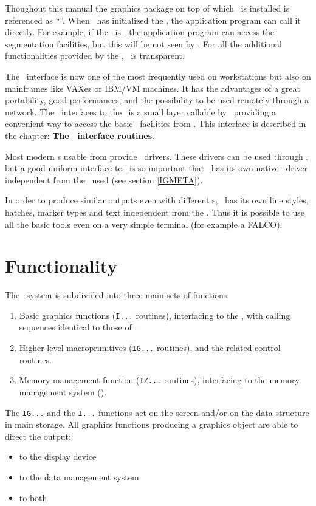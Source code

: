 Thoughout this manual the graphics package on top of which \HIGZ~is installed is
referenced as ``\UGP''. When \HIGZ~has initialized the \UGP, the application 
program can call it directly. For example, if the \UGP~is \GKS, the application
program can access the segmentation facilities, but this will be not seen by 
\HIGZ. For all the additional functionalities provided by the \UGP, \HIGZ~is
transparent.
 
The \XW~interface is now one of the most frequently used on workstations
but also on mainframes like VAXes or IBM/VM machines. It has the advantages
of a great portability, good performances, and the possibility to be used
remotely through a network. The \HIGZ~interfaces to the \XW~is a small
layer callable by \FORTRAN~providing a convenient way to access the basic 
\XLIB~facilities from \FORTRAN. This interface is described in the chapter:
{\bf The \XW~interface routines}.
 
Most modern \UGP s usable from \HIGZ{} provide \PS~drivers. These drivers
can be used through \HIGZ, but a good uniform interface to \PS~is so important
that \HIGZ~has its own native \PS~driver independent from the \UGP~used
(see section \ref{IGMETA}).
 
In order to produce similar outputs even with different \UGP s, \HIGZ~has its own
line styles, hatches, marker types and text independent from the \UGP. 
Thus it is possible to use all the basic tools even on a very simple terminal (for
example a FALCO).
 

\section{Functionality}
The \HIGZ~system is subdivided into three main sets of functions:
\begin{enumerate}
\item Basic graphics functions ({\tt I...} routines), interfacing to the \UGP,
      with calling sequences identical to those of \GKS.
\item Higher-level macroprimitives ({\tt IG...} routines), and the related 
      control routines.
\item Memory management function ({\tt IZ...} routines), interfacing to the
      memory management system (\ZEBRA).
\end{enumerate}
 
The {\tt IG...} and the {\tt I...} functions act on the screen and/or on the
data structure in main storage. All graphics functions producing a graphics
object are able to direct the output:
\begin{itemize}
\item to the display device
\item to the data management system
\item to both
\end{itemize}
 
